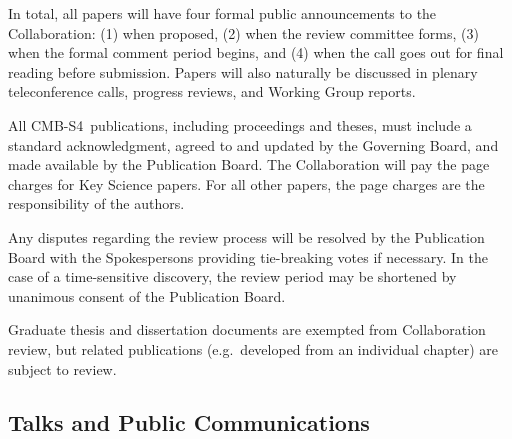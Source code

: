 \documentclass[12pt]{article}
\newcommand\collabname{CMB-S4}
\begin{document}
In total, all papers will have four formal public announcements to the Collaboration: (1) when proposed, (2) when the review committee forms, (3) when the formal comment period begins, and (4) when the call goes out for final reading before submission. Papers will also naturally be discussed in plenary teleconference calls, progress reviews, and Working Group reports.

All \collabname\ publications, including proceedings and theses, must include a standard acknowledgment, agreed to and updated by the Governing Board, and made available by the Publication Board. The Collaboration will pay the page charges for Key Science papers. For all other papers, the page charges are the responsibility of the authors.

Any disputes regarding the review process will be resolved by the Publication Board with the Spokespersons providing tie-breaking votes if necessary. In the case of a time-sensitive discovery, the review period may be shortened by unanimous consent of the Publication Board.

Graduate thesis and dissertation documents are exempted from Collaboration review, but related publications (e.g.~developed from an individual chapter) are subject to review.

\subsection{Talks and Public Communications}
\end{document}
